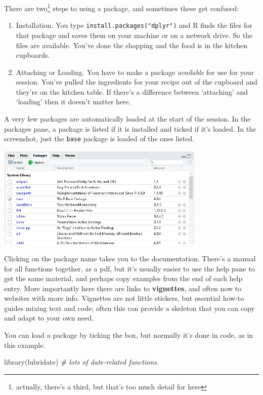 \documentclass[
]{book}
\newenvironment{Shaded}{\begin{snugshade}}{\end{snugshade}}
\newcommand{\CommentTok}[1]{\textcolor[rgb]{0.56,0.35,0.01}{\textit{#1}}}
\newcommand{\FunctionTok}[1]{\textcolor[rgb]{0.00,0.00,0.00}{#1}}
\newcommand{\NormalTok}[1]{#1}
\providecommand{\tightlist}{%
  \setlength{\itemsep}{0pt}\setlength{\parskip}{0pt}}
\begin{document}
There are two\footnote{actually, there's a third, but that's too much detail for here} steps to using a package, and sometimes these get confused:

\begin{enumerate}
\def\labelenumi{\arabic{enumi})}
\tightlist
\item
  Installation. You type \texttt{install.packages("dplyr")} and R finds the files for that package and saves them on your machine or on a network drive. So the files are available. You've done the shopping and the food is in the kitchen cupboards.
\item
  Attaching or Loading. You have to make a package \emph{available} for use for your session. You've pulled the ingredients for your recipe out of the cupboard and they're on the kitchen table. If there's a difference between `attaching' and `loading' then it doesn't matter here.
\end{enumerate}

A very few packages are automatically loaded at the start of the session. In the packages pane, a package is listed if it is installed and ticked if it's loaded. In the screenshot, just the \texttt{base} package is loaded of the ones listed.

\includegraphics[width=0.75\textwidth,height=\textheight]{images/packages.png}

Clicking on the package name takes you to the documentation. There's a manual for all functions together, as a pdf, but it's usually easier to use the help pane to get the same material, and perhaps copy examples from the end of each help entry. More importantly here there are links to \textbf{vignettes}, and often now to websites with more info. Vignettes are not little stickers, but essential how-to guides mixing text and code; often this can provide a skeleton that you can copy and adapt to your own need.

You can load a package by ticking the box, but normally it's done in code, as in this example.

\begin{Shaded}
\begin{Highlighting}[]
\FunctionTok{library}\NormalTok{(lubridate) }\CommentTok{\# lots of date{-}related functions.}
\end{Highlighting}
\end{Shaded}
\end{document}

